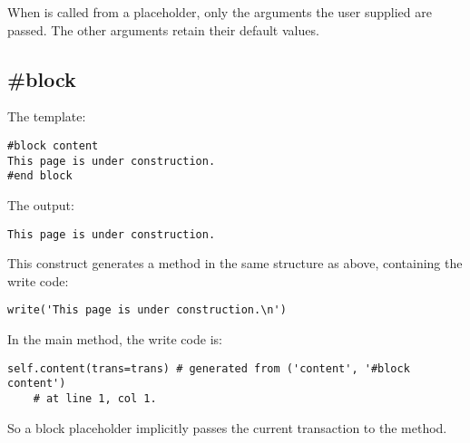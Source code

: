 When  is called from a placeholder, only the arguments the user
supplied are passed.  The other arguments retain their default values.


\subsection{\#block}
\label{inheritanceEtc.block}

The template:
\begin{verbatim}
#block content
This page is under construction.
#end block
\end{verbatim}

The output:
\begin{verbatim}
This page is under construction.
\end{verbatim}

This construct generates a method  in the same structure
as  above, containing the write code:
\begin{verbatim}
write('This page is under construction.\n')
\end{verbatim}

In the main method, the write code is:
\begin{verbatim}
self.content(trans=trans) # generated from ('content', '#block content')
    # at line 1, col 1.
\end{verbatim}

So a block placeholder implicitly passes the current transaction to the method.


